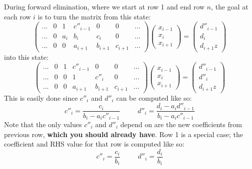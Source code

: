 \documentclass{article}
\begin{document}
During forward elimination, where we start at row 1 and end row $n$, the goal at each row $i$ is to turn the matrix from this state:
\begin{equation}
	\left( \begin{matrix}
	... & 0 & 1 & c''_{i - 1} & 0 & 0 & ... \\
	... & 0 & a_i & b_i & c_i & 0 & ... \\
	... & 0 & 0 & a_{i+1} & b_{i+1} & c_{i+1} & ...
	\end{matrix} \right)
	\left( \begin{matrix}
	x_{i - 1} \\
	x_i \\
	x_{i + 1}
	\end{matrix} \right)
	=
	\left( \begin{matrix}
	d''_{i - 1} \\
	d_i \\
	d_{i+1}	z
	\end{matrix} \right)
\end{equation}
into this state:
\begin{equation}
	\left( \begin{matrix}
	... & 0 & 1 & c''_{i - 1} & 0 & 0 & ... \\
	... & 0 & 0 & 1 & c''_i & 0 & ... \\
	... & 0 & 0 & a_{i+1} & b_{i+1} & c_{i+1} & ...
	\end{matrix} \right)
	\left( \begin{matrix}
	x_{i - 1} \\
	x_i \\
	x_{i + 1}
	\end{matrix} \right)
	=
	\left( \begin{matrix}
	d''_{i - 1} \\
	d''_i \\
	d_{i+1}	z
	\end{matrix} \right)
\end{equation}
This is easily done since $c''_i$ and $d''_i$ can be computed like so:
\begin{equation}
	c''_i = \frac{c_i}{b_i - a_ic''_{i-1}}
	\;\;\;\;\;\;\;\;\;
	d''_i = \frac{d_i - a_i d''_{i-1}}{b_i - a_ic''_{i-1}}
\end{equation}
Note that the only values $c''_i$ and $d''_i$ depend on are the new coefficients from previous row, \textbf{which you should already have}. Row 1 is a special case; the coefficient and RHS value for that row is computed like so:
\begin{equation}
	c''_i = \frac{c_i}{b_i}
	\;\;\;\;\;\;\;\;\;
	d''_i = \frac{d_i}{b_i}
\end{equation}
\end{document}
